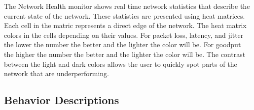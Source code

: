 \documentclass[letterpaper,twocolumn,10pt]{article}
\begin{document}
The Network Health monitor shows real time network statistics that describe the current state of the network. These statistics are presented using heat matrices. Each cell in the matric represents a direct edge of the network. The heat matrix colors in the cells depending on their values. For packet loss, latency, and jitter the lower the number the better and the lighter the color will be. For goodput the higher the number the better and the lighter the color will be. The contrast between the light and dark colors allows the user to quickly spot parts of the network that are underperforming.


\subsection{Behavior Descriptions}
\end{document}
